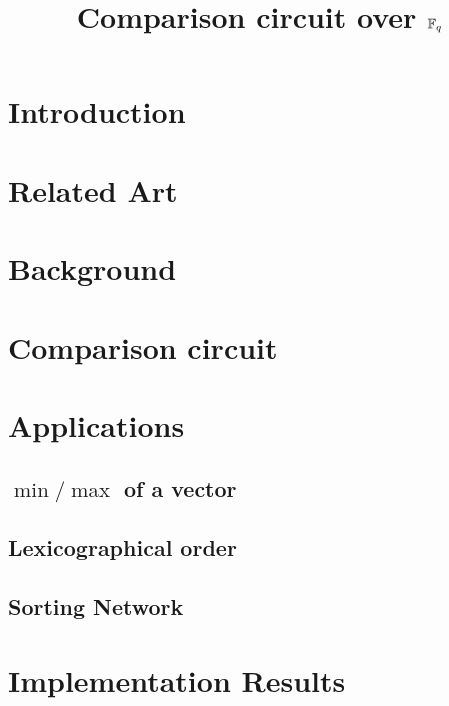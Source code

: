 \documentclass{llncs}
\title{Comparison circuit over $\mathbb{F}_q$}
\date{}
\author{}
\begin{document}
\maketitle

\section{Introduction}
\label{sec:introduction}




\section{Related Art}
\label{sec:related-art}



\section{Background}
\label{sec:background}



\section{Comparison circuit}
\label{sec:comparison-circuit}



\section{Applications}
\label{sec:applications}

\subsection{$\min/\max$ of a vector}
\label{sec:min/max}

\subsection{Lexicographical order}
\label{sec:lexic-order}

\subsection{Sorting Network}
\label{sec:sorting-network}


\section{Implementation Results}
\label{sec:impl-results}




\end{document}
